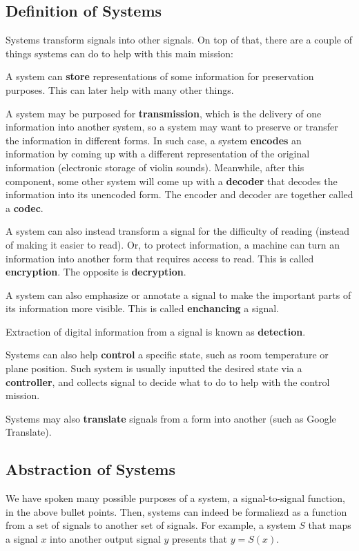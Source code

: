 \subsection{Definition of Systems}
Systems transform signals into other signals.
On top of that, there are a couple of things systems can do to help with this main mission:
\begin{bindenum}
    \item A system can \textbf{store} representations of some information for preservation purposes. This can later help with many other things.
    \item A system may be purposed for \textbf{transmission}, which is the delivery of one information into another system, so a system may want to preserve or transfer the information in different forms.
    \subitem In such case, a system \textbf{encodes} an information by coming up with a different representation of the original information (electronic storage of violin sounds). Meanwhile, after this component, some other system will come up with a \textbf{decoder} that decodes the information into its unencoded form.
    \subitem The encoder and decoder are together called a \textbf{codec}.
    \item A system can also instead transform a signal for the difficulty of reading (instead of making it easier to read). Or, to protect information, a machine can turn an information into another form that requires access to read. This is called \textbf{encryption}. The opposite is \textbf{decryption}.
    \item A system can also emphasize or annotate a signal to make the important parts of its information more visible. This is called \textbf{enchancing} a signal.
    \item Extraction of digital information from a signal is known as \textbf{detection}.
    \item Systems can also help \textbf{control} a specific state, such as room temperature or plane position. Such system is usually inputted the desired state via a \textbf{controller}, and collects signal to decide what to do to help with the control mission.
    \item Systems may also \textbf{translate} signals from a form into another (such as Google Translate).
\end{bindenum}

\subsection{Abstraction of Systems}
We have spoken many possible purposes of a system, a signal-to-signal function, in the above bullet points.
Then, systems can indeed be formaliezd as a function from a set of signals to another set of signals.
For example, a system $S$ that maps a signal $x$ into another output signal $y$ presents that $y = S(x)$.

